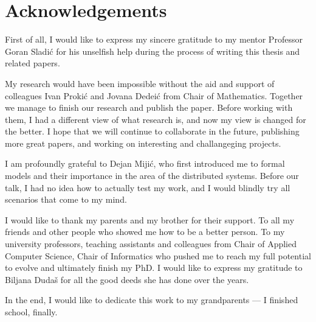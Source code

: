 \chapter*{Acknowledgements}
First of all, I would like to express my sincere gratitude to my mentor Professor Goran Sladi\'c for his unselfish help during the process of writing this thesis and related papers.

My research would have been impossible without the aid and support of colleagues Ivan Proki\'c and Jovana Dedei\'c from Chair of Mathematics. Together we manage to finish our research and publish the paper. Before working with them, I had a different view of what research is, and now my view is changed for the better. I hope that we will continue to collaborate in the future, publishing more great papers, and working on interesting and challangeging projects.

I am profoundly grateful to Dejan Miji\'c, who first introduced me to formal models and their importance in the area of the distributed systems. Before our talk, I had no idea how to actually test my work, and I would blindly try all scenarios that come to my mind.

I would like to thank my parents and my brother for their support. To all my friends and other people who showed me how to be a better person. To my university professors, teaching assistants and colleagues from Chair of Applied Computer Science, Chair of Informatics who pushed me to reach my full potential to evolve and ultimately finish my PhD. I would like to express my gratitude to Biljana Duda\v s for all the good deeds she has done over the years.

In the end, I would like to dedicate this work to my grandparents --- I finished school, finally.